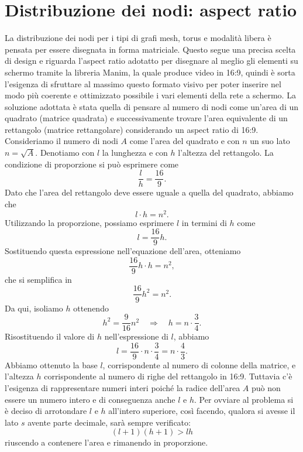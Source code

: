 \documentclass[binding=0.6cm]{sapthesis}
\begin{document}
\section{Distribuzione dei nodi: aspect ratio}
\label{sec:aspect_ratio}
La distribuzione dei nodi per i tipi di grafi mesh, torus e modalità libera è pensata per essere disegnata in forma matriciale. Questo segue una precisa scelta di design e riguarda
l'aspect ratio adotatto per disegnare al meglio gli elementi su schermo tramite la libreria Manim, la quale produce video in 16:9, quindi è sorta l'esigenza
di sfruttare al massimo questo formato visivo per poter inserire nel modo più coerente e ottimizzato possibile i vari elementi della rete a schermo.
La soluzione adottata è stata quella di pensare al numero di nodi come un'area di un quadrato (matrice quadrata) e successivamente trovare l'area equivalente 
di un rettangolo (matrice rettangolare) considerando un
aspect ratio di 16:9. Consideriamo il numero di nodi \(A\) come l'area del quadrato e con \(n\) un suo lato \(n = \sqrt{A}\).
Denotiamo con $l$ la lunghezza e con $h$ l'altezza del rettangolo. La condizione di proporzione si può esprimere come
\[
\frac{l}{h} = \frac{16}{9}.
\]
Dato che l'area del rettangolo deve essere uguale a quella del quadrato, abbiamo che
\[
l \cdot h = n^2.
\]
Utilizzando la proporzione, possiamo esprimere $l$ in termini di $h$ come
\[
l = \frac{16}{9}h.
\]
Sostituendo questa espressione nell'equazione dell'area, otteniamo
\[
\frac{16}{9}h \cdot h = n^2,
\]
che si semplifica in
\[
\frac{16}{9}h^2 = n^2.
\]
Da qui, isoliamo $h$ ottenendo
\[
h^2 = \frac{9}{16}n^2 \quad \Longrightarrow \quad h = n \cdot \frac{3}{4}.
\]
Risostituendo il valore di $h$ nell'espressione di $l$, abbiamo
\[
l = \frac{16}{9} \cdot n \cdot \frac{3}{4} = n \cdot \frac{4}{3}.
\]
Abbiamo ottenuto la base \(l\), corrispondente al numero di colonne della matrice, e l'altezza \(h\) corrispondente al numero
di righe del rettangolo in 16:9. Tuttavia c'è l'esigenza di rappresentare numeri interi poiché la radice dell'area \(A\) può non essere un numero intero e di conseguenza anche \(l\) e \(h\).
Per ovviare al problema si è deciso di arrotondare \(l\) e \(h\) all'intero superiore, così facendo, qualora si avesse
il lato \(s\) avente parte decimale, sarà sempre verificato:
\begin{equation}
    (l+1)(h+1)>lh
\end{equation}
riuscendo a contenere l'area e rimanendo in proporzione.
\end{document}
